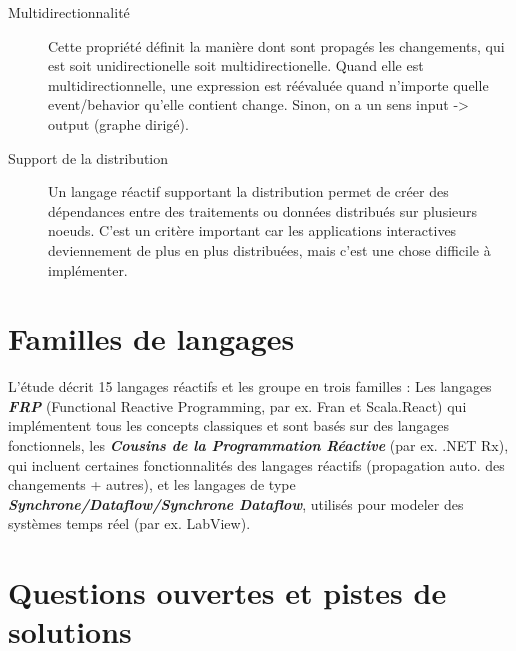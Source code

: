 \documentclass[10pt,final]{IEEEtran}
\begin{document}
\begin{description}
    \item[Multidirectionnalité]
    Cette propriété définit la manière dont sont propagés les changements, qui est soit unidirectionelle soit multidirectionelle. Quand elle est multidirectionnelle, une expression est réévaluée quand n'importe quelle event/behavior qu'elle contient change. Sinon, on a un sens input -> output (graphe dirigé).
    
    \item[Support de la distribution]
    Un langage réactif supportant la distribution permet de créer des dépendances entre des traitements ou données distribués sur plusieurs noeuds. C'est un critère important car les applications interactives deviennement de plus en plus distribuées, mais c'est une chose difficile à implémenter.
\end{description}


\section{Familles de langages}

L'étude décrit 15 langages réactifs et les groupe en trois familles : Les langages \textit{\textbf{FRP}} (Functional Reactive Programming, par ex. Fran et Scala.React) qui implémentent tous les concepts classiques et sont basés sur des langages fonctionnels, les \textit{\textbf{Cousins de la Programmation Réactive}} (par ex. .NET Rx), qui incluent certaines fonctionnalités des langages réactifs (propagation auto. des changements + autres), et les langages de type \textit{\textbf{Synchrone/Dataflow/Synchrone Dataflow}}, utilisés pour modeler des systèmes temps réel (par ex. LabView). 

\section{Questions ouvertes et pistes de solutions}
 
\end{document}
